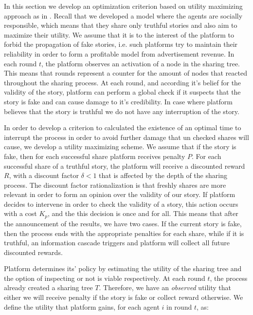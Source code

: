 In this section we develop an optimization criterion based on utility maximizing approach as in \cite{papanastasiou}. Recall that we developed a model where the agents are socially responsible, which means that they share only truthful stories and also aim to maximize their utility. We assume that it is to the interest of the platform to forbid the propagation of fake stories, i.e. such platforms try to maintain their reliability in order to form a profitable model from advertisement revenue. In each round $t$, the platform observes an activation of a node in the sharing tree. This means that rounds represent a counter for the amount of nodes that reacted throughout the sharing process. At each round, and according it's belief for the validity of the story, platform can perform a global check if it suspects that the story is fake and can cause damage to it's credibility. In case where platform believes that the story is truthful we do not have any interruption of the story. 

In order to develop a criterion to calculated the existence of an optimal time to interrupt the process in order to avoid further damage that un checked shares will cause, we develop a utility maximizing scheme. We assume that if the story is fake, then for each successful share platform receives penalty $P$. For each successful share of a truthful story, the platform will receive a discounted reward $R$, with a discount factor $\delta < 1$ that is affected by the depth of the sharing process. The discount factor rationalization is that freshly shares are more relevant in order to form an opinion over the validity of our story. If platform decides to intervene in order to check the validity of a story, this action occurs with a cost $K_p$, and the this decision is once and for all. This means that after the announcement of the results, we have two cases. If the current story is fake, then the process ends with the appropriate penalties for each share, while if it is truthful, an information cascade triggers and platform will collect all future discounted rewards. 

Platform determines its' policy by estimating the utility of the sharing tree and the option of inspecting or not is viable respectively. At each round $t$, the process already created a sharing tree $T$. Therefore, we have an \textit{observed} utility that either we will receive penalty if the story is fake or collect reward otherwise. We define the utility that platform gains, for each agent $i$ in round $t$, as:

